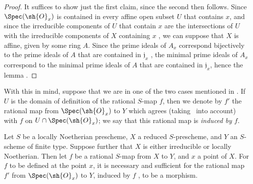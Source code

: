 \begin{proof}
It suffices to show just the first claim, since the second then follows.
Since $\Spec(\sh{O}_x)$ is contained in every affine open subset $U$ that contains $x$, and since the irreducible components of $U$ that contain $x$ are the intersections of $U$ with the irreducible components of $X$ containing $x$ , we can suppose that $X$ is affine, given by some ring $A$.
Since the prime ideals of $A_x$ correspond bijectively to the prime ideals
of $A$ that are contained in $\mathfrak{j}_x$ , the minimal prime ideals of $A_x$ correspond to the minimal prime ideals of $A$ that are contained in $\mathfrak{j}_x$, hence the lemma .
\end{proof}

With this in mind, suppose that we are in one of the two cases mentioned in .
If $U$ is the domain of definition of the rational $S$-map $f$, then we denote by $f'$ the rational map from $\Spec(\sh{O}_x)$ to $Y$ which agrees (taking~ into account) with $f$ on $U\cap\Spec(\sh{O}_x)$; we say that this rational map is \emph{induced by $f$}.

\begin{proposition}[7.2.9]
\label{I.7.2.9}
Let $S$ be a locally Noetherian prescheme, $X$ a reduced $S$-prescheme, and $Y$ an $S$-scheme of finite type.
Suppose further that $X$ is either irreducible or locally Noetherian.
Then let $f$ be a rational $S$-map from $X$ to $Y$, and $x$ a point of $X$.
For $f$ to be defined at the point $x$, it is necessary and sufficient for the rational map $f'$ from $\Spec(\sh{O}_x)$ to $Y$, induced by $f$ , to be a morphism.
\end{proposition}

